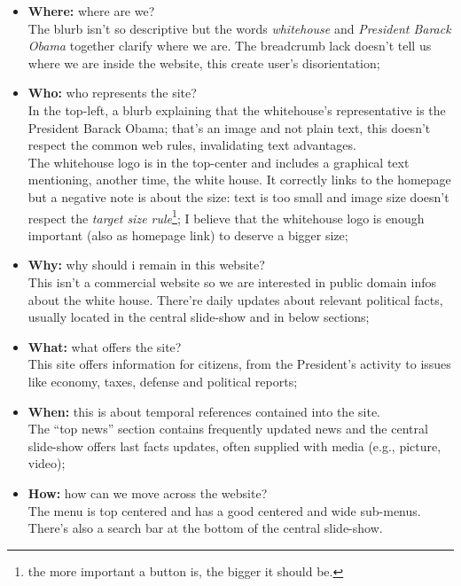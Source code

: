 \documentclass[
10pt, %
a4paper, %
oneside, %
headinclude,footinclude, %
BCOR5mm, %
]{scrartcl}
\begin{document}
\begin{itemize}%
	\item \textbf{Where:} where are we? \\ The blurb isn't so descriptive but the words \emph{whitehouse} and \emph{President Barack Obama} together clarify where we are. The breadcrumb lack doesn't tell us where we are inside the website, this create user's disorientation;

	\item \textbf{Who:} who represents the site? \\ In the top-left, a blurb explaining that the whitehouse's representative is the President Barack Obama; that's an image and not plain text, this doesn't respect the common web rules, invalidating text advantages. \\
	The whitehouse logo is in the top-center and includes a graphical text mentioning, another time, the white house. It correctly links to the homepage but a negative note is about the size: text is too small and image size doesn't respect the \emph{target size rule}\footnote{the more important a button is, the bigger it should be.}; I believe that the whitehouse logo is enough important (also as homepage link) to deserve a bigger size;

	\item \textbf{Why:} why should i remain in this website? \\ This isn't a commercial website so we are interested in public domain infos about the white house. There're daily updates about relevant political facts, usually located in the central slide-show and in below sections;

	\newpage
	\item \textbf{What:} what offers the site? \\ This site offers information for citizens, from the President's activity to issues like economy, taxes, defense and political reports;

	\item \textbf{When:} this is about temporal references contained into the site. \\ The ``top news'' section contains frequently updated news and the central slide-show offers last facts updates, often supplied with media (e.g., picture, video); 

	\item \textbf{How:} how can we move across the website? \\ The menu is top centered and has a good centered and wide sub-menus. There's also a search bar at the bottom of the central slide-show.

\end{itemize}
\end{document}
